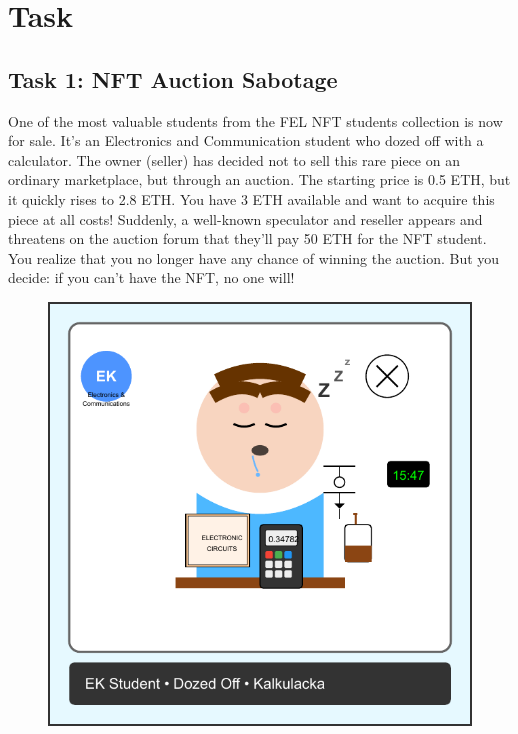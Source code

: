 \documentclass[12pt]{article}
\begin{document}
\section{Task}

\subsection*{Task 1: NFT Auction Sabotage}

One of the most valuable students from the FEL NFT students collection is now for sale. It's an Electronics and Communication student who dozed off with a calculator. The owner (seller) has decided not to sell this rare piece on an ordinary marketplace, but through an auction. The starting price is 0.5 ETH, but it quickly rises to 2.8 ETH. You have 3 ETH available and want to acquire this piece at all costs! Suddenly, a well-known speculator and reseller appears and threatens on the auction forum that they'll pay 50 ETH for the NFT student. You realize that you no longer have any chance of winning the auction. But you decide: if you can't have the NFT, no one will!

\begin{figure}[h!]
  \centering
  \begin{minipage}{0.3\textwidth}
    \includegraphics[width=\textwidth]{NFTs/ek-student-nft.pdf}
  \end{minipage}
\end{figure}
\end{document}
